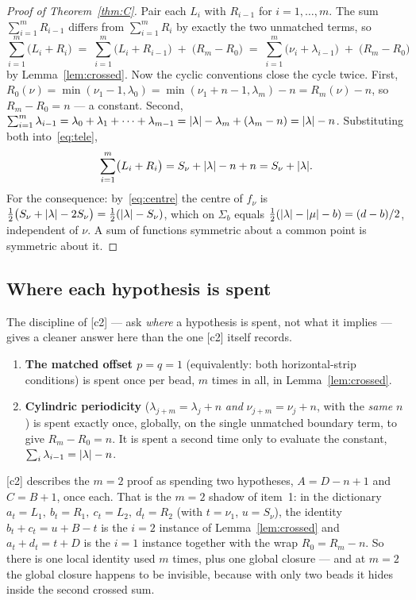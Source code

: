 \documentclass[11pt]{article}
\theoremstyle{definition}
\DeclarePairedDelimiter{\abs}{\lvert}{\rvert}
\begin{document}
\begin{proof}[Proof of Theorem~\ref{thm:C}]
Pair each $L_i$ with $R_{i-1}$ for $i=1,\dots,m$. The sum $\sum_{i=1}^mR_{i-1}$ differs
from $\sum_{i=1}^mR_i$ by exactly the two unmatched terms, so
\begin{equation}\label{eq:tele}
  \sum_{i=1}^m\bigl(L_i+R_i\bigr)
  \;=\;\sum_{i=1}^m\bigl(L_i+R_{i-1}\bigr)\;+\;\bigl(R_m-R_0\bigr)
  \;=\;\sum_{i=1}^m\bigl(\nu_i+\lambda_{i-1}\bigr)\;+\;\bigl(R_m-R_0\bigr)
\end{equation}
by Lemma~\ref{lem:crossed}. Now the cyclic conventions close the cycle twice. First,
$R_0(\nu)=\min(\nu_1-1,\lambda_0)=\min(\nu_1+n-1,\lambda_m)-n=R_m(\nu)-n$, so
$R_m-R_0=n$ --- a constant. Second,
$\sum_{i=1}^m\lambda_{i-1}=\lambda_0+\lambda_1+\dots+\lambda_{m-1}
=\abs{\lambda}-\lambda_m+(\lambda_m-n)=\abs{\lambda}-n$. Substituting both
into~\eqref{eq:tele},
\[
  \sum_{i=1}^m\bigl(L_i+R_i\bigr)=S_\nu+\abs{\lambda}-n+n=S_\nu+\abs{\lambda}.
\]
For the consequence: by~\eqref{eq:centre} the centre of $f_\nu$ is
$\tfrac12\bigl(S_\nu+\abs{\lambda}-2S_\nu\bigr)=\tfrac12(\abs{\lambda}-S_\nu)$, which on
$\Sigma_b$ equals $\tfrac12(\abs{\lambda}-\abs{\mu}-b)=(d-b)/2$, independent of $\nu$. A
sum of functions symmetric about a common point is symmetric about it.
\end{proof}

\subsection{Where each hypothesis is spent}

The discipline of [c2] --- ask \emph{where} a hypothesis is spent, not what it implies ---
gives a cleaner answer here than the one [c2] itself records.

\begin{enumerate}
\item \textbf{The matched offset $p=q=1$} (equivalently: both horizontal-strip conditions)
is spent once per bead, $m$ times in all, in Lemma~\ref{lem:crossed}.
\item \textbf{Cylindric periodicity} ($\lambda_{j+m}=\lambda_j+n$ \emph{and}
$\nu_{j+m}=\nu_j+n$, with the \emph{same} $n$) is spent exactly once, globally, on the
single unmatched boundary term, to give $R_m-R_0=n$. It is spent a second time only to
evaluate the constant, $\sum_i\lambda_{i-1}=\abs{\lambda}-n$.
\end{enumerate}

[c2] describes the $m=2$ proof as spending two hypotheses, $A=D-n+1$ and $C=B+1$, once each.
That is the $m=2$ shadow of item~1: in the dictionary
$a_t=L_1,\ b_t=R_1,\ c_t=L_2,\ d_t=R_2$ (with $t=\nu_1$, $u=S_\nu$), the identity
$b_t+c_t=u+B-t$ is the $i=2$ instance of Lemma~\ref{lem:crossed} and $a_t+d_t=t+D$ is the
$i=1$ instance together with the wrap $R_0=R_m-n$. So there is one local identity used
$m$ times, plus one global closure --- and at $m=2$ the global closure happens to be
invisible, because with only two beads it hides inside the second crossed sum.
\end{document}
